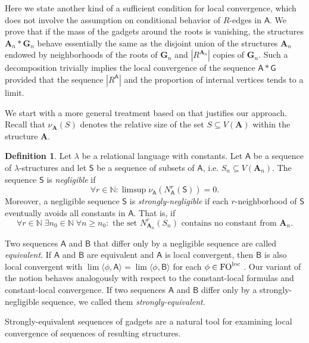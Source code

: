 \documentclass[11pt]{article}
\theoremstyle{plain}
\theoremstyle{definition}
\newtheorem{definition}{Definition}
\theoremstyle{remark}
\newcommand{\N}{\mathbb{N}}
\DeclareMathOperator\FO{FO}
\newcommand{\FOloc}[1]{\FO_{#1}^\textnormal{loc}}
\newcommand{\stonepar}[2]{\langle #1, #2 \rangle}
\newcommand{\str}[1]{\mathbf{#1}}
\newcommand{\strseq}[1]{{\boldsymbol{\mathsf{#1}}}}
\newcommand{\seq}[1]{{\mathsf{#1}}}
\begin{document}
Here we state another kind of a sufficient condition for local convergence, which does not involve the assumption on conditional behavior of $R$-edges in $\strseq{A}$.
We prove that if the mass of the gadgets around the roots is vanishing, the structures $\str{A}_n*\str{G}_n$ behave essentially the same as the disjoint union of the structures $\str{A}_n$ endowed by neighborhoods of the roots of $\str{G}_n$ and $|R^{\str{A}_n}|$ copies of $\str{G}_n$.
Such a decomposition trivially implies the local convergence of the sequence $\strseq{A}*\strseq{G}$ provided that the sequence $|R^\strseq{A}|$ and the proportion of internal vertices tends to a limit.

We start with a more general treatment based on \cite{clustering} that justifies our approach.
Recall that $\nu_\str{A}(S)$ denotes the relative size of the set $S \subseteq V(\str{A})$ within the structure $\str{A}$.

\begin{definition}\label{def:small_and_negligible}
    Let $\lambda$ be a relational language with constants.
    Let $\strseq{A}$ be a sequence of $\lambda$-structures and let $\seq{S}$ be a sequence of subsets of $\strseq{A}$, i.e. $S_n \subseteq V(\str{A}_n)$.
    The sequence $\seq{S}$ is \emph{negligible} if 
    \[
        \forall r \in \N: \limsup \nu_\strseq{A}(N_\strseq{A}^r(\seq{S})) = 0
        .
    \]
    Moreover, a negligible sequence $\seq{S}$ is \emph{strongly-negligible} if each $r$-neighborhood of $\seq{S}$ eventually avoids all constants in $\strseq{A}$.
    That is, if
    \[
        \forall r \in \N \;\exists n_0 \in \N \;\forall n \geq n_0: \text{ the set $N_{\str{A}_n}^r(S_n)$ contains no constant from $\str{A}_n$}
        .
    \]
\end{definition}

Two sequences $\strseq{A}$ and $\strseq{B}$ that differ only by a negligible sequence are called \emph{equivalent}.
If $\strseq{A}$ and $\strseq{B}$ are equivalent and $\strseq{A}$ is local convergent, then $\strseq{B}$ is also local convergent with $\lim \stonepar{\phi}{\strseq{A}} = \lim \stonepar{\phi}{\strseq{B}}$ for each $\phi \in \FOloc{}$ \cite[Lemma~3]{clustering}.
Our variant of the notion behaves analogously with respect to the constant-local formulas and constant-local convergence.
If two sequences $\strseq{A}$ and $\strseq{B}$ differ only by a strongly-negligible sequence, we called them \emph{strongly-equivalent}.

Strongly-equivalent sequences of gadgets are a natural tool for examining local convergence of sequences of resulting structures.
\end{document}
